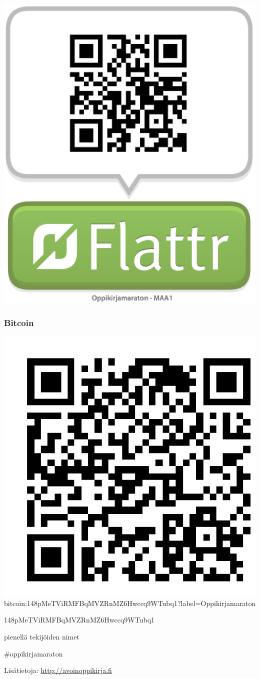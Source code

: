 \includegraphics[scale=0.2]{MAA1-Flattr.png}


\subsubsection*{Bitcoin}

\includegraphics[scale=0.2]{Oppikirjamaraton-Bitcoin.png}
bitcoin:148pMeTViRMFBqMVZRnMZ6Hwccq9WTubq1?label=Oppikirjamaraton

148pMeTViRMFBqMVZRnMZ6Hwccq9WTubq1


pienellä tekijöiden nimet

\#oppikirjamaraton


Lisätietoja: \url{http://avoinoppikirja.fi}
